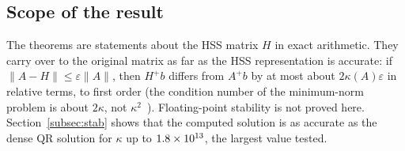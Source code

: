 \subsection{Scope of the result}
The theorems are statements about the HSS matrix $H$ in exact arithmetic. They carry over to the
original matrix as far as the HSS representation is accurate: if $\|A-H\|\le\varepsilon\|A\|$, then $H^+b$
differs from $A^+b$ by at most about $2\kappa(A)\varepsilon$ in relative terms, to first order (the
condition number of the minimum-norm problem is about $2\kappa$, not $\kappa^2$~\cite{dh}).
Floating-point stability is not proved here. Section~\ref{subsec:stab} shows that the computed solution
is as accurate as the dense QR solution for $\kappa$ up to $1.8\times10^{13}$, the largest value tested.
